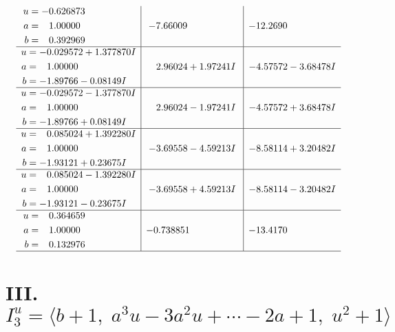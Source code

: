 \documentclass[1p]{elsarticle_modified}
\theoremstyle{definition}
\begin{document}
$$\begin{array}{c|c|c}
\begin{aligned}
u &= -0.626873\phantom{ +0.000000I} \\
a &= \phantom{-}1.00000\phantom{ +0.000000I} \\
b &= \phantom{-}0.392969\phantom{ +0.000000I}\end{aligned}
 & -7.66009\phantom{ +0.000000I} & -12.2690\phantom{ +0.000000I} \\ \hline\begin{aligned}
u &= -0.029572 + 1.377870 I \\
a &= \phantom{-}1.00000\phantom{ +0.000000I} \\
b &= -1.89766 - 0.08149 I\end{aligned}
 & \phantom{-}2.96024 + 1.97241 I & -4.57572 - 3.68478 I \\ \hline\begin{aligned}
u &= -0.029572 - 1.377870 I \\
a &= \phantom{-}1.00000\phantom{ +0.000000I} \\
b &= -1.89766 + 0.08149 I\end{aligned}
 & \phantom{-}2.96024 - 1.97241 I & -4.57572 + 3.68478 I \\ \hline\begin{aligned}
u &= \phantom{-}0.085024 + 1.392280 I \\
a &= \phantom{-}1.00000\phantom{ +0.000000I} \\
b &= -1.93121 + 0.23675 I\end{aligned}
 & -3.69558 - 4.59213 I & -8.58114 + 3.20482 I \\ \hline\begin{aligned}
u &= \phantom{-}0.085024 - 1.392280 I \\
a &= \phantom{-}1.00000\phantom{ +0.000000I} \\
b &= -1.93121 - 0.23675 I\end{aligned}
 & -3.69558 + 4.59213 I & -8.58114 - 3.20482 I \\ \hline\begin{aligned}
u &= \phantom{-}0.364659\phantom{ +0.000000I} \\
a &= \phantom{-}1.00000\phantom{ +0.000000I} \\
b &= \phantom{-}0.132976\phantom{ +0.000000I}\end{aligned}
 & -0.738851\phantom{ +0.000000I} & -13.4170\phantom{ +0.000000I}\\
 \hline 
 \end{array}$$\newpage\newpage\renewcommand{\arraystretch}{1}
\centering \section*{III. $I^u_{3}= \langle b+1,\;a^3 u-3 a^2 u+\cdots-2 a+1,\;u^2+1 \rangle$}
\end{document}

